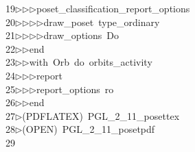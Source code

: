 \begin{tabbing}
19\>$\triangleright$\>$\triangleright$\>$\triangleright$\>poset\_classification\_report\_options\ \\[0pt]
20\>$\triangleright$\>$\triangleright$\>$\triangleright$\>$\triangleright$\>draw\_poset\ type\_ordinary\ \\[0pt]
21\>$\triangleright$\>$\triangleright$\>$\triangleright$\>$\triangleright$\>draw\_options\ Do\ \\[0pt]
22\>$\triangleright$\>$\triangleright$\>end\ \\[0pt]
23\>$\triangleright$\>$\triangleright$\>with\ Orb\ do\ orbits\_activity\ \\[0pt]
24\>$\triangleright$\>$\triangleright$\>$\triangleright$\>report\ \ \\[0pt]
25\>$\triangleright$\>$\triangleright$\>$\triangleright$\>report\_options\ ro\ \\[0pt]
26\>$\triangleright$\>$\triangleright$\>end\ \\[0pt]
27\>$\triangleright$\>(PDFLATEX)\ PGL\_2\_11\_posettex\\[0pt]
28\>$\triangleright$\>(OPEN)\ PGL\_2\_11\_posetpdf\\[0pt]
29\>\end{tabbing}
